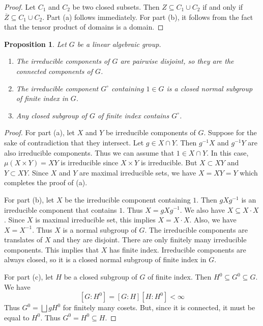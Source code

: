 \documentclass[]{pcmi}
\theoremstyle{plain}
\newtheorem{Proposition}[equation]{Proposition}
\theoremstyle{definition}
\begin{document}
\begin{proof}
    Let $C_1$ and $C_2$ be two closed subsets. Then $Z \subseteq C_1 \cup C_2$ if and only if $\overline{Z} \subseteq C_1 \cup C_2$. Part (a) follows immediately. For part (b), it follows from the fact that the tensor product of domains is a domain. 
\end{proof}

\begin{Proposition}
    Let $G$ be a linear algebraic group. 
    \begin{enumerate}[label = (\alph*)]
        \item The irreducible components of $G$ are pairwise disjoint, so they are the connected components of $G$. 
        \item The irreducible component $G^\circ$ containing $1 \in G$ is a closed normal subgroup of finite index in $G$. 
        \item Any closed subgroup of $G$ of finite index contains $G^\circ$.
    \end{enumerate}
\end{Proposition}

\begin{proof}
    For part (a), let $X$ and $Y$ be irreducible components of $G$. Suppose for the sake of contradiction that they intersect. Let $g \in X \cap Y$. Then $g^{-1}X$ and $g^{-1}Y$ are also irreducible components. Thus we can assume that $1 \in X \cap Y$. In this case, $\mu(X \times Y) = XY$ is irreducible since $X \times Y$ is irreducible. But $X \subset XY$ and $Y \subset XY$. Since $X$ and $Y$ are maximal irreducible sets, we have $X = XY = Y$ which completes the proof of (a). 

    For part (b), let $X$ be the irreducible component containing $1$. Then $gXg^{-1}$ is an irreducible component that contains $1$. Thus $X = gXg^{-1}$. We also have $X \subseteq X \cdot X$. Since $X$ is maximal irreducible set, this implies $X = X \cdot X$. Also, we have $X = X^{-1}$. Thus $X$ is a normal subgroup of $G$. The irreducible components are translates of $X$ and they are disjoint. There are only finitely many irreducible components. This implies that $X$ has finite index. Irreducible components are always closed, so it is a closed normal subgroup of finite index in $G$. 

    For part (c), let $H$ be a closed subgroup of $G$ of finite index. Then $H^0 \subseteq G^0 \subseteq G$. We have 
    \[
        [G : H^0] = [G : H] [H : H^0] < \infty
    \] 
    Thus $G^0 = \bigsqcup g H^0$ for finitely many cosets. But, since it is connected, it must be equal to $H^0$. Thus $G^0 = H^0 \subseteq H$. 
\end{proof}
\end{document}
